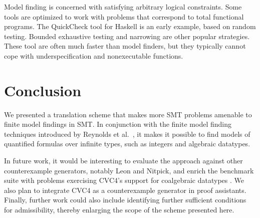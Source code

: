 \documentclass[runningheads,a4paper]{llncs}
\newcommand\cvc{CVC4\xspace}
\newcommand\concret{\gamma} %
\begin{document}
Model finding is concerned with satisfying arbitrary logical constraints. Some
tools are optimized to work with problems that correspond to total functional
programs. The QuickCheck tool for Haskell \cite{claessen-hughes-2000} is an early example, based
on random testing. Bounded exhaustive testing \cite{runciman-et-al-2008} and
narrowing \cite{lindblad-2008-testing} are other popular strategies. These tool
are often much faster than model finders, but they typically cannot cope with
underspecification and nonexecutable functions.




%
%
%

\section{Conclusion}
\label{sec:conclusion}

We presented a translation scheme that makes more SMT problems amenable to
finite model findings in SMT. In conjunction with the finite model finding
techniques introduced by Reynolds et al.\
\cite{ReyEtAl-1-RR-13,reynolds-et-al-2013}, it makes it possible to
find models of quantified formulas over infinite types, such as integers
and algebraic datatypes.

In future work, it would be interesting to evaluate the approach against other
counterexample generators, notably Leon and Nitpick, and enrich the benchmark
suite with problems exercising \cvc's support for coalgebraic datatypes
\cite{reynolds-blanchette-2015-codata}. We also plan to integrate \cvc as a
counterexample generator in proof assistants. Finally, further work could also
include identifying further sufficient conditions for admissibility, thereby
enlarging the scope of the scheme presented here.
\end{document}
